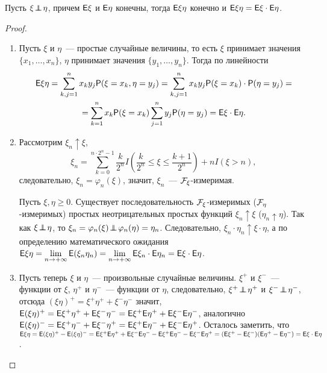 \begin{theorem}
	Пусть $\xi \!\perp\!\!\!\!\perp\! \eta$, причем $\mathsf{E} \xi$ и $\mathsf{E} \eta$ конечны, тогда $\mathsf{E} \xi \eta$ конечно и $\mathsf{E} \xi \eta = \mathsf{E} \xi \cdot \mathsf{E} \eta$.
	\begin{proof}
	    \begin{enumerate}
	        \item Пусть $\xi$ и $\eta$~--- простые случайные величины, то есть $\xi$ принимает значения $\{ x_1, \ldots, x_n \}$, $\eta$ принимает значения $\{ y_1, \ldots, y_n \}$. Тогда по линейности
    		\begin{multline*}
    			\mathsf{E} \xi \eta = \sum\limits_{k,j=1}^{n} x_k y_j \mathsf{P} (\xi = x_k, \eta = y_j) = \sum\limits_{k,j=1}^n x_k y_j \mathsf{P}(\xi = x_k) \cdot \mathsf{P}(\eta = y_j) = \\ = \sum\limits_{k = 1}^n x_k \mathsf{P} (\xi = x_k) \sum\limits_{j = 1}^{n} y_j \mathsf{P} (\eta = y_j) = \mathsf{E} \xi \cdot \mathsf{E} \eta.
    		\end{multline*}
    			
    		\item Рассмотрим $\xi_n \uparrow \xi$, 
    		$$\xi_n = \sum\limits_{k=0}^{n \cdot 2^n - 1} \dfrac{k}{2^n} I \left(\dfrac{k}{2^n} \leqslant \xi \leqslant \dfrac{k+1}{2^n} \right) + n I(\xi > n),$$
    		 следовательно, $\xi_n = \varphi_n(\xi)$, значит, $\xi_n$~--- $\mathcal{F}_\xi$-измеримая. 
    		 
    		 Пусть $\xi, \eta \geqslant 0$. Существует последовательность $\mathcal{F}_\xi$-измеримых ($\mathcal{F}_\eta$-измеримых) простых неотрицательных простых функций $\xi_n \uparrow \xi$ ($\eta_n \uparrow \eta$). Так как $\xi \!\perp\!\!\!\!\perp\! \eta$, то $\xi_n = \varphi_n (\xi) \!\perp\!\!\!\!\perp\! \varphi_n(\eta) = \eta_n$. Следовательно, $\xi_n \cdot \eta_n \uparrow \xi \cdot \eta$, а по определению математического ожидания $\mathsf{E} \xi\eta = \lim\limits_{n \rightarrow +\infty} \mathsf{E} (\xi_n \eta_n) =  \lim\limits_{n \rightarrow +\infty} \mathsf{E} \xi_n \cdot \mathsf{E} \eta_n = \mathsf{E} \xi \cdot \mathsf{E} \eta$.
    			
    		\item Пусть теперь $\xi$ и $\eta$~--- произвольные случайные величины. $\xi^+$ и $\xi^-$~--- функции от $\xi$, $\eta^+$ и $\eta^-$~--- функции от $\eta$, следовательно, $\xi^+ \!\perp\!\!\!\!\perp\! \eta^+$ и $\xi^- \!\perp\!\!\!\!\perp\! \eta^-$, отсюда $(\xi \eta)^+ = \xi^+ \eta^+ + \xi^- \eta^-$ значит, $\mathsf{E} (\xi \eta)^+ = \mathsf{E} \xi^+ \eta^+ + \mathsf{E} \xi^- \eta^- = \mathsf{E} \xi^+ \mathsf{E} \eta^+ + \mathsf{E} \xi^- \mathsf{E} \eta^-$, аналогично $\mathsf{E} (\xi \eta)^- = \mathsf{E} \xi^+ \eta^- + \mathsf{E} \xi^- \eta^+ = \mathsf{E} \xi^+ \mathsf{E} \eta^- + \mathsf{E} \xi^- \mathsf{E} \eta^+$. Осталось заметить, что $\mathsf{E} \xi \eta = \mathsf{E} (\xi \eta)^+ - \mathsf{E} ( \xi \eta)^- = \mathsf{E} \xi^+ \mathsf{E} \eta^+ + \mathsf{E} \xi^- \mathsf{E} \eta^- - \mathsf{E} \xi^+ \mathsf{E} \eta^- - \mathsf{E} \xi^- \mathsf{E} \eta^+ =  (\mathsf{E} \xi^+ - \mathsf{E} \xi^-) (\mathsf{E} \eta^+ - \mathsf{E} \eta^-) = \mathsf{E} \xi \cdot \mathsf{E} \eta$.
	    \end{enumerate}
	\end{proof}
\end{theorem}
	
